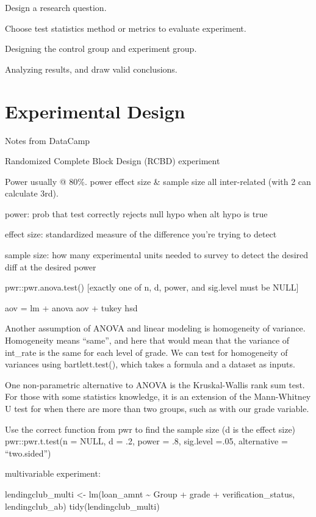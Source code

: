 \documentclass[]{book}
\begin{document}
Design a research question.

Choose test statistics method or metrics to evaluate experiment.

Designing the control group and experiment group.

Analyzing results, and draw valid conclusions.

\hypertarget{experimental-design}{%
\section{Experimental Design}\label{experimental-design}}

Notes from DataCamp

Randomized Complete Block Design (RCBD) experiment

Power usually @ 80\%. power effect size \& sample size all inter-related (with 2 can calculate 3rd).

power: prob that test correctly rejects null hypo when alt hypo is true

effect size: standardized measure of the difference you're trying to detect

sample size: how many experimental units needed to survey to detect the desired diff at the desired power

pwr::pwr.anova.test() {[}exactly one of n, d, power, and sig.level must be NULL{]}

aov = lm + anova \textbar{} aov + tukey hsd

Another assumption of ANOVA and linear modeling is homogeneity of variance. Homogeneity means ``same'', and here that would mean that the variance of int\_rate is the same for each level of grade. We can test for homogeneity of variances using bartlett.test(), which takes a formula and a dataset as inputs.

One non-parametric alternative to ANOVA is the Kruskal-Wallis rank sum test. For those with some statistics knowledge, it is an extension of the Mann-Whitney U test for when there are more than two groups, such as with our grade variable.

Use the correct function from pwr to find the sample size (d is the effect size)
pwr::pwr.t.test(n = NULL, d = .2, power = .8, sig.level =.05, alternative = ``two.sided'')

multivariable experiment:

lendingclub\_multi \textless{}- lm(loan\_amnt \textasciitilde{} Group + grade + verification\_status, lendingclub\_ab)
tidy(lendingclub\_multi)
\end{document}
